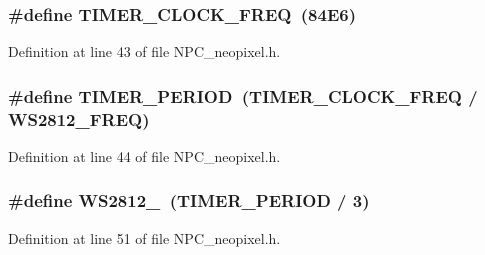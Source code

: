 \subsubsection[{\texorpdfstring{T\+I\+M\+E\+R\+\_\+\+C\+L\+O\+C\+K\+\_\+\+F\+R\+EQ}{TIMER_CLOCK_FREQ}}]{\setlength{\rightskip}{0pt plus 5cm}\#define T\+I\+M\+E\+R\+\_\+\+C\+L\+O\+C\+K\+\_\+\+F\+R\+EQ~(84\+E6)}\hypertarget{group___constant_ga5f1fac9f0aaabad0683c04e44a1aefe9}{}\label{group___constant_ga5f1fac9f0aaabad0683c04e44a1aefe9}


Definition at line 43 of file N\+P\+C\+\_\+neopixel.\+h.

\subsubsection[{\texorpdfstring{T\+I\+M\+E\+R\+\_\+\+P\+E\+R\+I\+OD}{TIMER_PERIOD}}]{\setlength{\rightskip}{0pt plus 5cm}\#define T\+I\+M\+E\+R\+\_\+\+P\+E\+R\+I\+OD~({\bf T\+I\+M\+E\+R\+\_\+\+C\+L\+O\+C\+K\+\_\+\+F\+R\+EQ} / {\bf W\+S2812\+\_\+\+F\+R\+EQ})}\hypertarget{group___constant_gad888acf7c13a4bedd6541ceb5cf9bf6d}{}\label{group___constant_gad888acf7c13a4bedd6541ceb5cf9bf6d}


Definition at line 44 of file N\+P\+C\+\_\+neopixel.\+h.

\subsubsection[{\texorpdfstring{W\+S2812\+\_\+0}{WS2812_0}}]{\setlength{\rightskip}{0pt plus 5cm}\#define W\+S2812\+\_~({\bf T\+I\+M\+E\+R\+\_\+\+P\+E\+R\+I\+OD} / 3)}\hypertarget{group___constant_ga3c67cd1a76ba7e85676da5f023f42430}{}\label{group___constant_ga3c67cd1a76ba7e85676da5f023f42430}


Definition at line 51 of file N\+P\+C\+\_\+neopixel.\+h.

